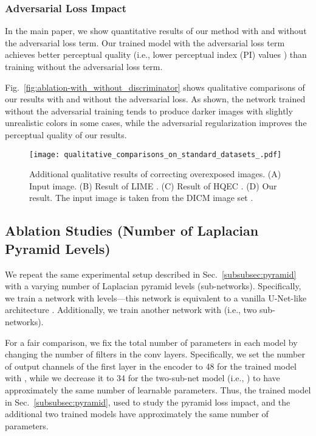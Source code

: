 \documentclass[final]{cvpr}
\begin{document}
\subsubsection{Adversarial Loss Impact}

In the main paper, we show quantitative results of our method with and without the adversarial loss term. Our trained model with the adversarial loss term achieves better perceptual quality (i.e., lower perceptual index (PI) values \cite{blau20182018}) than training without the adversarial loss term. 


Fig.\ \ref{fig:ablation-with_without_discriminator} shows qualitative comparisons of our results with and without the adversarial loss. As shown, the network trained without the adversarial training tends to produce darker images with slightly unrealistic colors in some cases, while the adversarial regularization improves the perceptual quality of our results.



\begin{figure*}[t]
\centering
\texttt{[image: qualitative\_comparisons\_on\_standard\_datasets\_.pdf]}
\vspace{-2mm}
\caption{Additional qualitative results of correcting overexposed images. (A) Input image. (B) Result of LIME \cite{guo2016lime, guo2017lime}. (C) Result of HQEC \cite{HQEC}. (D) Our result. 
The input image is taken from the DICM image set \cite{lee2012contrast}.}
\label{fig:qualitative_comparisons_on_DICM}
\end{figure*}






\subsection{Ablation Studies (Number of Laplacian Pyramid Levels)}

We repeat the same experimental setup described in Sec.\ \ref{subsubsec:pyramid} with a varying number of Laplacian pyramid levels (sub-networks). Specifically, we train a network with  levels---this network is equivalent to a vanilla U-Net-like architecture \cite{unet}. Additionally, we train another network with  (i.e., two sub-networks).


For a fair comparison, we fix the total number of parameters in each model by changing the number of filters in the conv layers. Specifically, we set the number of output channels of the first layer in the encoder to 48 for the trained model with , while we decrease it to 34 for the two-sub-net model (i.e., ) to have approximately the same number of learnable parameters.  Thus, the trained model in Sec.\ \ref{subsubsec:pyramid}, used to study the pyramid loss impact, and the additional two trained models have approximately the same number of parameters.
\end{document}
